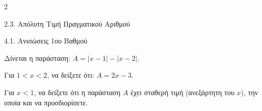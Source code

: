 \begin{ylh}{2}
    \item 2.3. Απόλυτη Τιμή Πραγματικού Αριθμού
    \item 4.1. Ανισώσεις 1ου Βαθμού
\end{ylh}
Δίνεται η παράσταση: ${A} = |x - 1| - |x - 2|$.

\begin{alist}
\item Για $1 < x < 2$, να δείξετε ότι: ${A} = 2x - 3$.
\item Για $x < 1$, να δείξετε ότι η παράσταση ${A}$ έχει σταθερή τιμή (ανεξάρτητη του $x$), την οποία και να προσδιορίσετε.
\end{alist}

